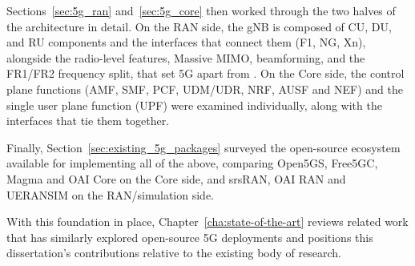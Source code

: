 Sections~\ref{sec:5g_ran} and~\ref{sec:5g_core} then worked through the two halves of the architecture in detail. On the \gls{RAN} side, the \gls{gNB} is composed of \gls{CU}, \gls{DU}, and \gls{RU} components and the interfaces that connect them (\gls{F1}, \gls{NG}, \gls{Xn}), alongside the radio-level features, Massive \gls{MIMO}, beamforming, and the FR1/FR2 frequency split, that set 5G  apart from . On the Core side, the control plane functions (\gls{AMF}, \gls{SMF}, \gls{PCF}, \gls{UDM}/\gls{UDR}, \gls{NRF}, \gls{AUSF} and \gls{NEF}) and the single user plane function (\gls{UPF}) were examined individually, along with the interfaces that tie them together.

Finally, Section~\ref{sec:existing_5g_packages} surveyed the open-source ecosystem available for implementing all of the above, comparing Open5GS, Free5GC, Magma and \gls{OAI} Core on the Core side, and srsRAN, \gls{OAI} \gls{RAN} and UERANSIM on the \gls{RAN}/simulation side.

With this foundation in place, Chapter~\ref{cha:state-of-the-art} reviews related work that has similarly explored open-source 5G deployments and positions this dissertation's contributions relative to the existing body of research.